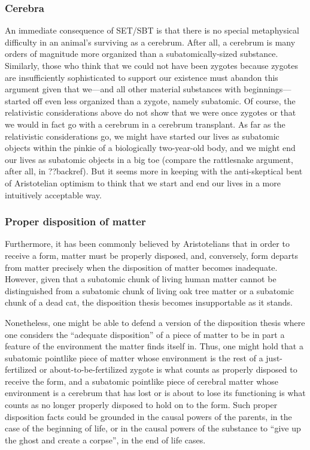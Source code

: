 \subsubsection{Cerebra}
An immediate consequence of SET/SBT is that there is no special metaphysical difficulty in an animal's 
surviving as a cerebrum. After all, a cerebrum is many orders of magnitude more organized than a subatomically-sized
substance. Similarly, those who think that we could not have been zygotes because zygotes are insufficiently sophisticated
to support our existence must abandon this argument given that we---and all other material substances with beginnings---started
off even less organized than a zygote, namely subatomic. Of course, the relativistic considerations above do not 
show that we were once zygotes or that we would in fact go with a cerebrum in a cerebrum transplant. As far as the relativistic 
considerations go, we might have started our lives as subatomic objects within the pinkie of a biologically two-year-old 
body, and we might end our lives as subatomic objects in a big toe (compare the rattlesnake argument, after all, in ??backref).
But it seems more in keeping with the anti-skeptical bent of Aristotelian optimism to think that we start and end our lives 
in a more intuitively acceptable way.

\subsubsection{Proper disposition of matter}
Furthermore, it has been commonly believed by Aristotelians that in order to receive a form, matter must be properly disposed, and,
conversely, form departs from matter precisely when the disposition of matter becomes inadequate. However, given that a subatomic chunk of living human matter cannot be distinguished from a subatomic chunk of living oak tree matter or a subatomic chunk of a dead cat, the disposition thesis becomes insupportable as it stands. 

Nonetheless, one might be able to defend a version of the disposition thesis where one considers the ``adequate disposition'' of 
a piece of matter to be in part a feature of the environment the matter finds itself in. Thus, one might hold that a subatomic
pointlike piece of matter whose environment is the rest of a just-fertilized or about-to-be-fertilized zygote is what counts as 
properly disposed to receive the form, and a subatomic pointlike piece of cerebral matter whose environment is a cerebrum that 
has lost or is about to lose its functioning is what counts as no longer properly disposed to hold on to the form. Such proper
disposition facts could be grounded in the causal powers of the parents, in the case of the beginning of life, or in the causal 
powers of the substance to ``give up the ghost and create a corpse'', in the end of life cases. 

